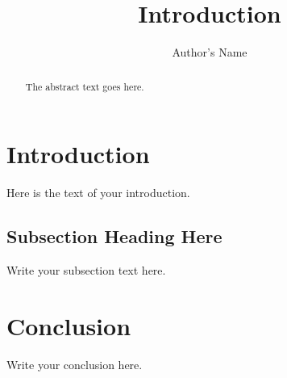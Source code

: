 \documentclass{article}
\begin{document}
\title{Introduction}
\author{Author's Name}

\maketitle

\begin{abstract}
The abstract text goes here.
\end{abstract}

\section{Introduction}
Here is the text of your introduction.


\subsection{Subsection Heading Here}
Write your subsection text here.



\section{Conclusion}
Write your conclusion here.
\end{document}

